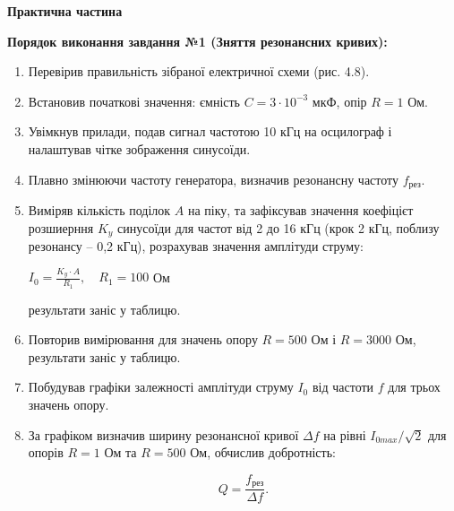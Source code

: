 \documentclass[12pt,a4paper]{article}
\begin{document}
    \newpage


    \setlength{\parindent}{0pt}

    \begin{center}
        \textbf{\Large Практична частина}
    \end{center}

    \textbf{Порядок виконання завдання №1 (Зняття резонансних кривих):}

    \begin{enumerate}
        \item Перевірив правильність зібраної електричної схеми (рис. 4.8).
    
        \item Встановив початкові значення: ємність $C = 3\cdot10^{-3}$ мкФ, опір $R = 1$ Ом.
    
        \item Увімкнув прилади, подав сигнал частотою 10 кГц на осцилограф і налаштував чітке зображення синусоїди.
    
        \item Плавно змінюючи частоту генератора, визначив резонансну частоту $f_{\text{рез}}$.
    
        \item Виміряв кількість поділок $A$ на піку, та зафіксував значення коефіцієт розшиерння $K_y$ синусоїди для частот від 2 до 16 кГц (крок 2 кГц, поблизу резонансу – 0,2 кГц), розрахував значення амплітуди струму:

        \vspace{-0.5em}

        \begin{center}
            $\displaystyle I_0 = \frac{K_y \cdot A}{R_1}, \quad R_1 = 100$ Ом
        \end{center}

        \vspace{-0.5em}

        результати заніс у таблицю.
    
        \item Повторив вимірювання для значень опору $R = 500$ Ом і $R = 3000$ Ом, результати заніс у таблицю.
    
        \item Побудував графіки залежності амплітуди струму $I_0$ від частоти $f$ для трьох значень опору.
    
        \item За графіком визначив ширину резонансної кривої $\Delta f$ на рівні $I_{0 max}/\sqrt{2}$ для опорів $R = 1$ Ом та $R = 500$ Ом, обчислив добротність:
        
        \begin{equation}
            Q = \frac{f_{\text{рез}}}{\Delta f}.
            \tag{4.п1}
        \end{equation}

    \end{enumerate}
\end{document}
